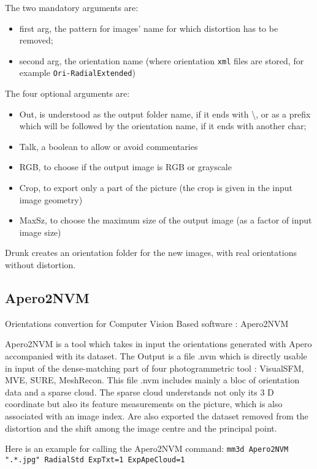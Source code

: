 The two mandatory arguments are:
\begin{itemize}
    \item first arg, the pattern for images' name for which distortion has to be removed;
    \item second arg, the orientation name (where orientation {\tt xml} files are stored, for example {\tt Ori-RadialExtended})
\end{itemize}

\vspace{\baselineskip}
The four optional arguments are:
\begin{itemize}
    \item Out, is understood as the output folder name, if it ends with \textbackslash, or as a prefix which will be followed by the orientation name, if it ends with another char;
    \item Talk, a boolean to allow or avoid commentaries
    \item RGB, to choose if the output image is RGB or grayscale
    \item Crop, to export only a part of the picture (the crop is given in the input image geometry)
    \item MaxSz, to choose the maximum size of the output image (as a factor of input image size)
\end{itemize}

Drunk creates an orientation folder for the new images, with real orientations without distortion.

\subsection{Apero2NVM}

Orientations convertion for Computer Vision Based software : Apero2NVM

Apero2NVM is a tool which takes in input the orientations generated with Apero accompanied with its dataset. The Output is a file .nvm which is directly usable in input of the dense-matching part of four photogrammetric tool : VisualSFM, MVE, SURE, MeshRecon. This file .nvm includes mainly a bloc of orientation data and a sparse cloud. The sparse cloud understands not only its 3 D coordinate but also its feature measurements on the picture, which is also associated with an image index.
Are also exported the dataset removed from the distortion and the shift among the image centre and the principal point.

Here is an example for calling the Apero2NVM command:
{\tt mm3d Apero2NVM ".*.jpg" RadialStd ExpTxt=1 ExpApeCloud=1}

